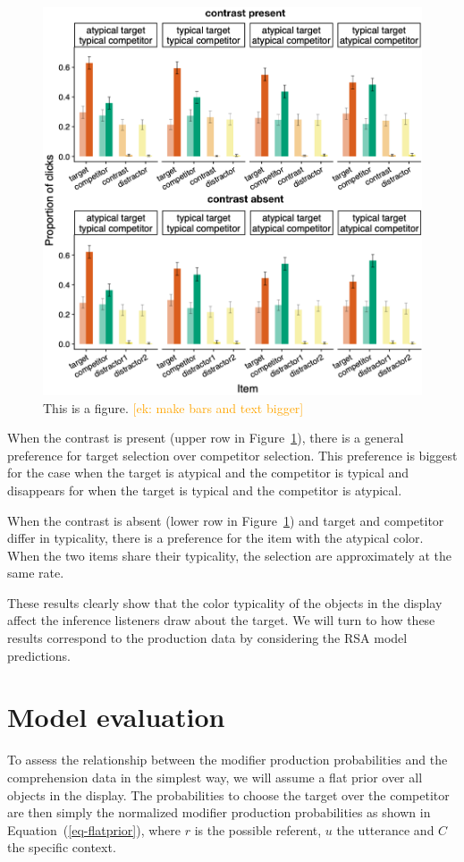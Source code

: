 \documentclass[10pt,letterpaper]{article}
\newcommand{\ek}[1]{\textcolor{Orange}{[ek: #1]}}
\begin{document}
\begin{figure}
	\begin{center}
		\includegraphics[width=.475\textwidth]{graphs/compr-bycond-paper.pdf}
	\end{center}
\caption{This is a figure. \ek{make bars and text bigger}} 
\label{compr-results}
\end{figure}

When the contrast is present (upper row in Figure~\ref{compr-results}), there is a general preference for target selection over competitor selection. This preference is biggest for the case when the target is atypical and the competitor is typical and disappears for when the target is typical and the competitor is atypical. 

When the contrast is absent (lower row in Figure~\ref{compr-results}) and target and competitor differ in typicality, there is a preference for the item with the atypical color. When the two items share their typicality, the selection are approximately at the same rate. 

These results clearly show that the color typicality of the objects in the display affect the inference listeners draw about the target. We will turn to how these results correspond to the production data by considering the RSA model predictions.

\section{Model evaluation}

To assess the relationship between the modifier production probabilities and the comprehension data in the simplest way, we will assume a flat prior over all objects in the display. The probabilities to choose the target over the competitor are then simply the normalized modifier production probabilities as shown in Equation~(\ref{eq-flatprior}), where $r$ is the possible referent, $u$ the utterance and $C$ the specific context.
\end{document}
